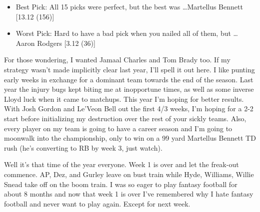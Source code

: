 \documentclass[11pt,letterpaper]{article}
\begin{document}
\begin{itemize}
\item Best Pick: All 15 picks were perfect, but the best was \dots Martellus Bennett [13.12 (156)]
\item Worst Pick: Hard to have a bad pick when you nailed all of them, but \dots Aaron Rodgers [3.12 (36)]
\end{itemize}
For those wondering, I wanted Jamaal Charles and Tom Brady too. If my strategy wasn't made implicitly clear last year, I'll spell it out here. I like punting early weeks in exchange for a dominant team towards the end of the season. Last year the injury bugs kept biting me at inopportune times, as well as some inverse Lloyd luck when it came to matchups. This year I'm hoping for better results. With Josh Gordon and Le'Veon Bell out the first 4/3 weeks, I'm hoping for a 2-2 start before initializing my destruction over the rest of your sickly teams. Also, every player on my team is going to have a career season and I'm going to moonwalk into the championship, only to win on a 99 yard Martellus Bennett TD rush (he's converting to RB by week 3, just watch).


\newpage
{}

Well it's that time of the year everyone. Week 1 is over and let the freak-out commence. AP, Dez, and Gurley leave on bust train while Hyde, Williams, Willie Snead take off on the boom train. I was so eager to play fantasy football for about 8 months and now that week 1 is over I've remembered why I hate fantasy football and never want to play again. Except for next week.
\end{document}
